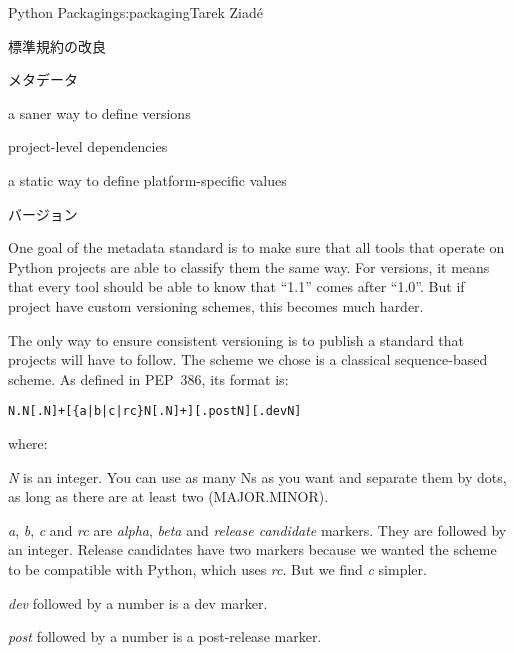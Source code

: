 \begin{aosachapter}{Python Packaging}{s:packaging}{Tarek Ziad\'{e}}
\begin{aosasect1}{標準規約の改良}
\begin{aosasect2}{メタデータ}
\begin{aosaitemize}

  \item a saner way to define versions

  \item project-level dependencies

  \item a static way to define platform-specific values

\end{aosaitemize}

\begin{aosasect3}{バージョン}

One goal of the metadata standard is to make sure that all tools that
operate on Python projects are able to classify them the same
way. For versions, it means that every tool should be able to know
that ``1.1'' comes after ``1.0''. But if project have custom
versioning schemes, this becomes much harder.

The only way to ensure consistent versioning is to publish a standard
that projects will have to follow.  The scheme we chose is a
classical sequence-based scheme.  As defined in PEP~386, its format
is:

\begin{verbatim}
N.N[.N]+[{a|b|c|rc}N[.N]+][.postN][.devN]
\end{verbatim}

\noindent where:

\begin{aosaitemize}

  \item \emph{N} is an integer. You can use as many Ns as you want and
  separate them by dots, as long as there are at least two
  (MAJOR.MINOR).

  \item \emph{a}, \emph{b}, \emph{c} and \emph{rc} are \emph{alpha},
  \emph{beta} and \emph{release candidate} markers. They are followed
  by an integer. Release candidates have two markers because we wanted
  the scheme to be compatible with Python, which uses \emph{rc}. But
  we find \emph{c} simpler.

  \item \emph{dev} followed by a number is a dev marker.

  \item \emph{post} followed by a number is a post-release marker.


\end{aosaitemize}
\end{aosasect3}
\end{aosasect2}
\end{aosasect1}
\end{aosachapter}
